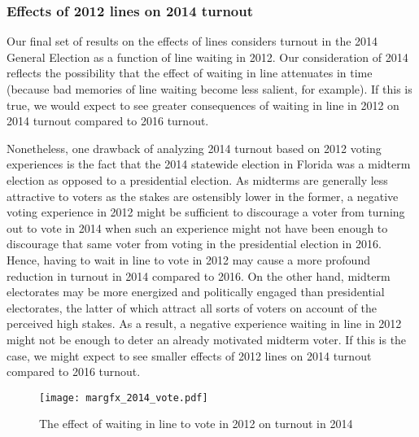 \documentclass[12pt,titlepage]{article}
\begin{document}
\subsubsection*{Effects of 2012 lines on 2014 turnout}

Our final set of results on the effects of lines considers turnout in
the 2014 General Election as a function of line waiting in 2012.  Our
consideration of 2014 reflects the possibility that the effect of
waiting in line attenuates in time (because bad memories of line
waiting become less salient, for example).  If this is true, we would
expect to see greater consequences of waiting in line in 2012 on 2014
turnout compared to 2016 turnout. 

Nonetheless, one drawback of analyzing 2014 turnout based on 2012
voting experiences is the fact that the 2014 statewide election in
Florida was a midterm election as opposed to a presidential election.
As midterms are generally less attractive to voters as the stakes are
ostensibly lower in the former, a negative voting experience in 2012
might be sufficient to discourage a voter from turning out to vote in
2014 when such an experience might not have been enough to discourage
that same voter from voting in the presidential election in 2016.
Hence, having to wait in line to vote in 2012 may cause a more
profound reduction in turnout in 2014 compared to 2016.  On the other
hand, midterm electorates may be more energized and politically
engaged than presidential electorates, the latter of which attract all
sorts of voters on account of the perceived high stakes.  As a result,
a negative experience waiting in line in 2012 might not be enough to
deter an already motivated midterm voter.  If this is the case, we
might expect to see smaller effects of 2012 lines on 2014 turnout
compared to 2016 turnout.




\begin{figure}[!ht]
  \caption{The effect of waiting in line to vote in 2012 on turnout in 2014}
  \centering\texttt{[image: margfx\_2014\_vote.pdf]}
  \label{fig:prvoting2014}
\end{figure}
\end{document}
